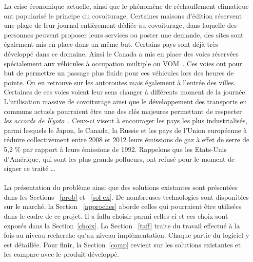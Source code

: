 \documentclass[12pt, a4paper, oneside]{article}
\begin{document}
    \indent La crise économique actuelle, ainsi que le phénomène de réchauffement climatique ont popularisé le principe du covoiturage. Certaines maisons d'édition réservent une plage de leur journal entièrement dédiée au covoiturage, dans laquelle des personnes peuvent proposer leurs services ou poster une demande, des sites sont également mis en place dans un même but. Certains pays sont déjà très développé dans ce domaine. Ainsi le Canada a mis en place des voies réservées spécialement aux véhicules à occupation multiple ou VOM~\cite{article-VOM}. Ces voies ont pour but de permettre un passage plus fluide pour ces véhicules lors des heures de pointe. On en retrouve sur les autoroutes mais également à l'entrée des villes. Certaines de ces voies voient leur sens changer à différents moment de la journée. L'utilisation massive de covoiturage ainsi que le développement des transports en communs actuels pourraient être une des clés majeures permettant de respecter \textit{les accords de Kyoto}~\cite{article-Kyoto}. Ceux-ci visent à encourager les pays les plus industrialisés, parmi lesquels le Japon, le Canada, la Russie et les pays de l'Union européenne à réduire collectivement entre 2008 et 2012 leurs émissions de gaz à effet de serre de 5,2 $\%$ par rapport à leurs émissions de 1992. Rappelons que les Etats-Unis d'Amérique, qui sont les plus grands pollueurs, ont refusé pour le moment de signer ce traité \dots\\\\
    \indent La présentation du problème ainsi que des solutions existantes sont présentées dans les Sections ~\ref{prob} et ~\ref{sol-ex}. De nombreuses technologies sont disponibles sur le marché, la Section ~\ref{approches} aborde celles qui pourraient être utilisées dans le cadre de ce projet. Il a fallu choisir parmi celles-ci et ces choix sont exposés dans la Section~\ref{choix}. La Section~ \ref{taff} traite du travail effectué à la fois au niveau recherche qu'au niveau implémentation. Chaque partie du logiciel y est détaillée. Pour finir, la Section~\ref{comp} revient sur les solutions existantes et les compare avec le produit développé.
    
\end{document}
